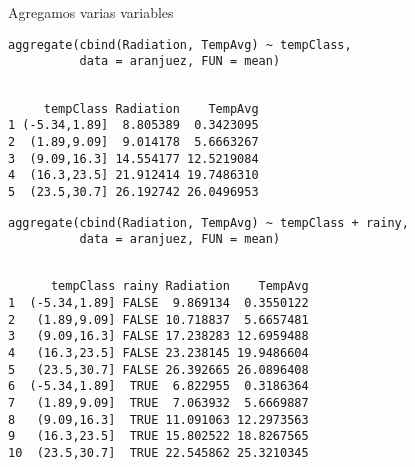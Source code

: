 \documentclass[xcolor={usenames,svgnames,dvipsnames}]{beamer}
\begin{document}
\begin{frame}[label={sec:orgdc3d0df},fragile]{Agregamos varias variables}
 \lstset{language=r,label= ,caption= ,captionpos=b,numbers=none}
\begin{lstlisting}
aggregate(cbind(Radiation, TempAvg) ~ tempClass,
          data = aranjuez, FUN = mean)
\end{lstlisting}

\begin{verbatim}

     tempClass Radiation    TempAvg
1 (-5.34,1.89]  8.805389  0.3423095
2  (1.89,9.09]  9.014178  5.6663267
3  (9.09,16.3] 14.554177 12.5219084
4  (16.3,23.5] 21.912414 19.7486310
5  (23.5,30.7] 26.192742 26.0496953
\end{verbatim}


\lstset{language=r,label= ,caption= ,captionpos=b,numbers=none}
\begin{lstlisting}
aggregate(cbind(Radiation, TempAvg) ~ tempClass + rainy,
          data = aranjuez, FUN = mean)
\end{lstlisting}

\begin{verbatim}

      tempClass rainy Radiation    TempAvg
1  (-5.34,1.89] FALSE  9.869134  0.3550122
2   (1.89,9.09] FALSE 10.718837  5.6657481
3   (9.09,16.3] FALSE 17.238283 12.6959488
4   (16.3,23.5] FALSE 23.238145 19.9486604
5   (23.5,30.7] FALSE 26.392665 26.0896408
6  (-5.34,1.89]  TRUE  6.822955  0.3186364
7   (1.89,9.09]  TRUE  7.063932  5.6669887
8   (9.09,16.3]  TRUE 11.091063 12.2973563
9   (16.3,23.5]  TRUE 15.802522 18.8267565
10  (23.5,30.7]  TRUE 22.545862 25.3210345
\end{verbatim}
\end{frame}
\end{document}
